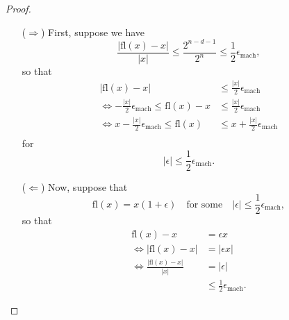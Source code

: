 
\begin{proof}
    \begin{itemize}
        \item[($\Rightarrow$)]
            First, suppose we have
            \[
                \frac{\lvert \text{fl}(x) - x \rvert}{\lvert x \rvert}
                \leq \frac{2^{n-d-1}}{2^n} \leq \frac{1}{2}\epsilon_{\text{mach}},
            \]
            so that
            \begin{equation*}
                \begin{split}
                    \lvert \text{fl}(x) - x \rvert &\leq \frac{\lvert x \rvert}{2}
                    \epsilon_{\text{mach}} \\
                    \Leftrightarrow -\frac{\lvert x \rvert}{2}\epsilon_{\text{mach}}
                    \leq \text{fl}(x) - x &\leq \frac{\lvert x \rvert}{2}
                    \epsilon_{\text{mach}} \\
                    \Leftrightarrow x - \frac{\lvert x \rvert}{2}\epsilon_{\text{mach}}
                    \leq \text{fl}(x) &\leq x + \frac{\lvert x \rvert}{2}
                    \epsilon_{\text{mach}} \\
                \end{split}
            \end{equation*}
            for
            \[
                \lvert \epsilon \rvert \leq \frac{1}{2}\epsilon_{\text{mach}}.
            \]
        \item[($\Leftarrow$)]
            Now, suppose that
            \[
                \text{fl}(x) = x(1 + \epsilon) \quad \text{for some} \quad 
                \lvert \epsilon \rvert \leq \frac{1}{2}\epsilon_{\text{mach}},
            \]
            so that
            \begin{equation*}
                \begin{split}
                    \text{fl}(x) - x &= \epsilon x\\
                    \Leftrightarrow \lvert \text{fl}(x) - x \rvert 
                                     &= \lvert \epsilon x \rvert \\
                    \Leftrightarrow \frac{\lvert \text{fl}(x) - x\rvert}{\lvert x \rvert}
                                     &= \lvert \epsilon \rvert \\
                                     &\leq \frac{1}{2}\epsilon_{\text{mach}}.
                \end{split} 
            \end{equation*}
    \end{itemize}
\end{proof}
